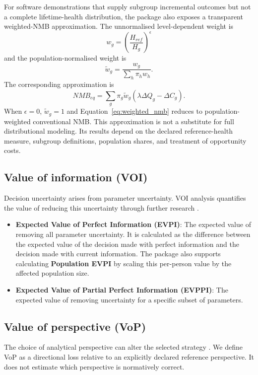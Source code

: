 \documentclass[article]{jss}
\begin{document}
For software demonstrations that supply subgroup incremental outcomes but not
a complete lifetime-health distribution, the package also exposes a
transparent weighted-NMB approximation. The unnormalised level-dependent
weight is
\begin{equation} \label{eq:weights}
w_g = \left( \frac{H_{ref}}{H_g} \right)^\epsilon
\end{equation}
and the population-normalised weight is
\begin{equation} \label{eq:normalised_weights}
\widetilde w_g=\frac{w_g}{\sum_h\pi_h w_h}.
\end{equation}
The corresponding approximation is
\begin{equation} \label{eq:weighted_nmb}
NMB_{eq}=\sum_g\pi_g\widetilde w_g(\lambda\Delta Q_g-\Delta C_g).
\end{equation}
When $\epsilon=0$, $\widetilde w_g=1$ and Equation~\ref{eq:weighted_nmb}
reduces to population-weighted conventional NMB. This approximation is not a
substitute for full distributional modeling. Its results depend on the
declared reference-health measure, subgroup definitions, population shares,
and treatment of opportunity costs.

\subsection{Value of information (VOI)}
Decision uncertainty arises from parameter uncertainty. VOI analysis quantifies the value of reducing this uncertainty through further research \citep{claxton2001}.
\begin{itemize}
    \item \textbf{Expected Value of Perfect Information (EVPI)}: The expected value of removing all parameter uncertainty. It is calculated as the difference between the expected value of the decision made with perfect information and the decision made with current information. The package also supports calculating \textbf{Population EVPI} by scaling this per-person value by the affected population size.
    \item \textbf{Expected Value of Partial Perfect Information (EVPPI)}: The expected value of removing uncertainty for a specific subset of parameters.
\end{itemize}

\subsection{Value of perspective (VoP)}
The choice of analytical perspective can alter the selected strategy
\citep{mordaunt2024ssrn}. We define VoP as a directional loss relative to an
explicitly declared reference perspective. It does not estimate which
perspective is normatively correct.
\end{document}
